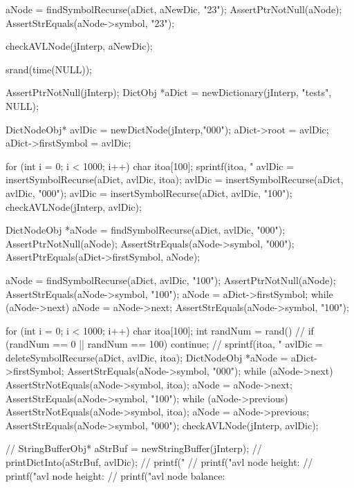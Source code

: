   aNode = findSymbolRecurse(aDict, aNewDic, "23");
  AssertPtrNotNull(aNode);
  AssertStrEquals(aNode->symbol, "23");

  checkAVLNode(jInterp, aNewDic);
\stopCTest
\stopTestCase

\startCTest

  srand(time(NULL));

  AssertPtrNotNull(jInterp);
  DictObj *aDict = newDictionary(jInterp, "tests", NULL);

  DictNodeObj* avlDic = newDictNode(jInterp,"000");
  aDict->root         = avlDic;
  aDict->firstSymbol  = avlDic;

  for (int i = 0; i < 1000; i++) {
    char itoa[100];
    sprintf(itoa, "%
    avlDic = insertSymbolRecurse(aDict, avlDic, itoa);
  }
  avlDic = insertSymbolRecurse(aDict, avlDic, "000");
  avlDic = insertSymbolRecurse(aDict, avlDic, "100");
  checkAVLNode(jInterp, avlDic);

  DictNodeObj *aNode = findSymbolRecurse(aDict, avlDic, "000");
  AssertPtrNotNull(aNode);
  AssertStrEquals(aNode->symbol, "000");
  AssertPtrEquals(aDict->firstSymbol, aNode);
  
  aNode = findSymbolRecurse(aDict, avlDic, "100");
  AssertPtrNotNull(aNode);
  AssertStrEquals(aNode->symbol, "100");
  aNode = aDict->firstSymbol;
  while (aNode->next) aNode = aNode->next;
  AssertStrEquals(aNode->symbol, "100");
  
  for (int i = 0; i < 1000; i++) {
    char itoa[100];
    int randNum = rand() %
    //
    if (randNum == 0 || randNum == 100) continue;
    //
    sprintf(itoa, "%
    avlDic = deleteSymbolRecurse(aDict, avlDic, itoa);
    DictNodeObj *aNode = aDict->firstSymbol;
    AssertStrEquals(aNode->symbol, "000");
    while (aNode->next) {
      AssertStrNotEquals(aNode->symbol, itoa);
      aNode = aNode->next;
    }
    AssertStrEquals(aNode->symbol, "100");   
    while (aNode->previous) {
      AssertStrNotEquals(aNode->symbol, itoa);
      aNode = aNode->previous;
    }
    AssertStrEquals(aNode->symbol, "000");
    checkAVLNode(jInterp, avlDic);
  }
  
//  StringBufferObj* aStrBuf = newStringBuffer(jInterp);
//  printDictInto(aStrBuf, avlDic);
//  printf("%
//  printf("avl node height: %
//  printf("avl node height: %
//  printf("avl node balance: %
\stopCTest
\stopTestCase
\stopTestSuite
